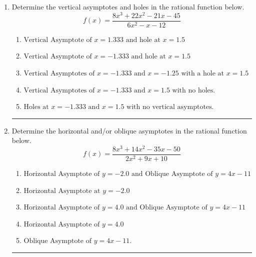 \documentclass[14pt]{extbook}
\newcommand{\litem}[1]{\item#1\hspace*{-1cm}\rule{\textwidth}{0.4pt}}
\begin{document}
\begin{enumerate}
\litem{
Determine the vertical asymptotes and holes in the rational function below.\[ f(x) = \frac{8x^{3} +22 x^{2} -21 x -45}{6x^{2} -x -12} \]\begin{enumerate}[label=\Alph*.]
\item \( \text{Vertical Asymptote of } x = 1.333 \text{ and hole at } x = 1.5 \)
\item \( \text{Vertical Asymptote of } x = -1.333 \text{ and hole at } x = 1.5 \)
\item \( \text{Vertical Asymptotes of } x = -1.333 \text{ and } x = -1.25 \text{ with a hole at } x = 1.5 \)
\item \( \text{Vertical Asymptotes of } x = -1.333 \text{ and } x = 1.5 \text{ with no holes.} \)
\item \( \text{Holes at } x = -1.333 \text{ and } x = 1.5 \text{ with no vertical asymptotes.} \)

\end{enumerate} }
\litem{
Determine the horizontal and/or oblique asymptotes in the rational function below.\[ f(x) = \frac{8x^{3} +14 x^{2} -35 x -50}{2x^{2} +9 x + 10} \]\begin{enumerate}[label=\Alph*.]
\item \( \text{Horizontal Asymptote of } y = -2.0 \text{ and Oblique Asymptote of } y = 4x -11 \)
\item \( \text{Horizontal Asymptote at } y = -2.0 \)
\item \( \text{Horizontal Asymptote of } y = 4.0 \text{ and Oblique Asymptote of } y = 4x -11 \)
\item \( \text{Horizontal Asymptote of } y = 4.0  \)
\item \( \text{Oblique Asymptote of } y = 4x -11. \)


\end{enumerate}}
\end{enumerate}
\end{document}
